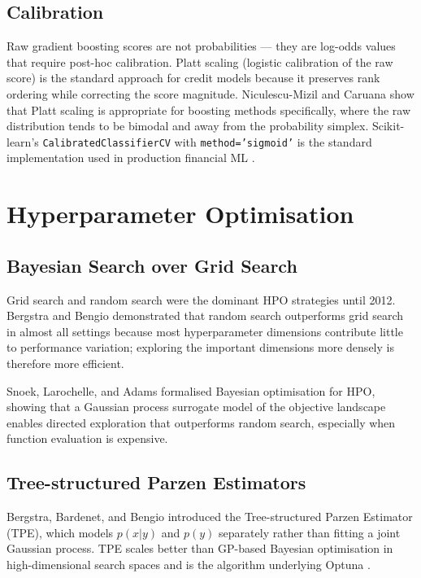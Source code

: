 \documentclass[12pt, a4paper]{article}
\begin{document}
\subsection{Calibration}

Raw gradient boosting scores are not probabilities --- they are log-odds values
that require post-hoc calibration.
Platt scaling (logistic calibration of the raw score) \cite{platt1999} is the
standard approach for credit models because it preserves rank ordering while
correcting the score magnitude.
Niculescu-Mizil and Caruana \cite{niculescu2005} show that Platt scaling is
appropriate for boosting methods specifically, where the raw distribution tends
to be bimodal and away from the probability simplex.
Scikit-learn's \texttt{CalibratedClassifierCV} with \texttt{method='sigmoid'} is
the standard implementation used in production financial ML \cite{pedregosa2011}.

\section{Hyperparameter Optimisation}

\subsection{Bayesian Search over Grid Search}

Grid search and random search were the dominant HPO strategies until 2012.
Bergstra and Bengio \cite{bergstra2012} demonstrated that random search outperforms
grid search in almost all settings because most hyperparameter dimensions contribute
little to performance variation; exploring the important dimensions more densely
is therefore more efficient.

Snoek, Larochelle, and Adams \cite{snoek2012} formalised Bayesian optimisation for
HPO, showing that a Gaussian process surrogate model of the objective landscape
enables directed exploration that outperforms random search, especially when
function evaluation is expensive.

\subsection{Tree-structured Parzen Estimators}

Bergstra, Bardenet, and Bengio \cite{bergstra2011} introduced the Tree-structured
Parzen Estimator (TPE), which models $p(x|y)$ and $p(y)$ separately rather than
fitting a joint Gaussian process.
TPE scales better than GP-based Bayesian optimisation in high-dimensional search
spaces and is the algorithm underlying Optuna \cite{akiba2019}.
\end{document}
